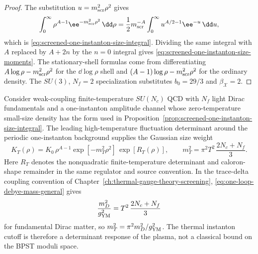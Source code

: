 \begin{proof}
The substitution \(u=m_{\rm scr}^2\rho^2\) gives
\[
  \int_0^\infty\rho^{A-1}\ee^{-m_{\rm scr}^2\rho^2}\,\dd\rho
  =
  \frac12m_{\rm scr}^{-A}
  \int_0^\infty u^{A/2-1}\ee^{-u}\,\dd u,
\]
which is \eqref{eq:screened-one-instanton-size-integral}.  Dividing the same
integral with \(A\) replaced by \(A+2n\) by the \(n=0\) integral gives
\eqref{eq:screened-one-instanton-size-moments}.  The stationary-shell formulas
come from differentiating
\(A\log\rho-m_{\rm scr}^2\rho^2\) for the \(\dd\log\rho\) shell and
\((A-1)\log\rho-m_{\rm scr}^2\rho^2\) for the ordinary density.  The
\(SU(3)\), \(N_f=2\) specialization substitutes
\(b_0=29/3\) and \(\beta_{\mathcal X}=2\).
\end{proof}

\begin{controlledapproximation}
\label{ca:thermal-instanton-determinant-screening}
Consider weak-coupling finite-temperature \(SU(N_c)\) QCD with \(N_f\) light
Dirac fundamentals and a one-instanton amplitude channel whose zero-temperature
small-size density has the form used in
Proposition~\ref{prop:screened-one-instanton-size-integral}.  The leading
high-temperature fluctuation determinant around the periodic one-instanton
background supplies the Gaussian size weight
\begin{equation}
  K_T(\rho)
  =
  K_0\,\rho^{A-1}
  \exp[-m_T^2\rho^2]\,
  \exp[R_T(\rho)],
  \qquad
  m_T^2=\pi^2T^2\,\frac{2N_c+N_f}{3}.
  \label{eq:thermal-instanton-screening-density}
\end{equation}
Here \(R_T\) denotes the nonquadratic finite-temperature determinant and
caloron-shape remainder in the same regulator and source convention.  In the
trace-delta coupling convention of
Chapter~\ref{ch:thermal-gauge-theory-screening},
\eqref{eq:one-loop-debye-mass-general} gives
\[
  \frac{m_D^2}{g_{\rm YM}^2}
  =
  T^2\,\frac{2N_c+N_f}{3}
\]
for fundamental Dirac matter, so \(m_T^2=\pi^2m_D^2/g_{\rm YM}^2\).  The
thermal instanton cutoff is therefore a determinant response of the plasma,
not a classical bound on the BPST moduli space.


\end{controlledapproximation}
